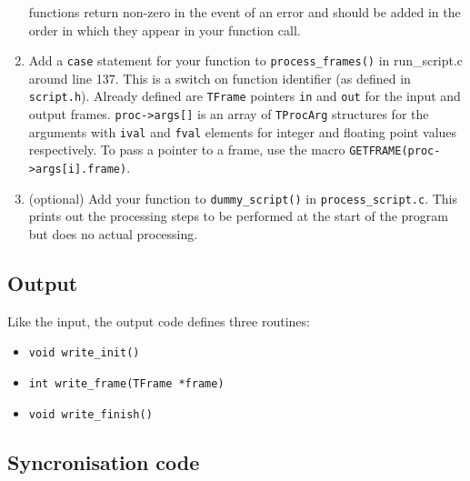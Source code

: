 \documentclass[12pt, a4paper]{article}
\begin{document}
\begin{enumerate}
  functions return non-zero in the event of an error and should be added in the order
  in which they appear in your function call.
\item Add a \texttt{case} statement for your function to \texttt{process\_frames()}
  in {run\_script.c} around line 137. This is a switch on function identifier
  (as defined in \texttt{script.h}). Already defined are \texttt{TFrame} pointers
  \texttt{in} and \texttt{out} for the input and output frames. 
  \texttt{proc->args[]} is an array of \texttt{TProcArg} structures for the
  arguments with \texttt{ival} and \texttt{fval} elements for integer and floating point
  values respectively. To pass a pointer to a frame, use the macro
  \texttt{GETFRAME(proc->args[i].frame)}.
\item (optional) Add your function to \texttt{dummy\_script()} in
  \texttt{process\_script.c}. This prints out the processing steps to be performed
  at the start of the program but does no actual processing. 
\end{enumerate}

\subsection{Output}

Like the input, the output code defines three routines:
\begin{itemize}
\item \texttt{void write\_init()}
\item \texttt{int write\_frame(TFrame *frame)}
\item \texttt{void write\_finish()}
\end{itemize}

\subsection{Syncronisation code}
\end{document}
